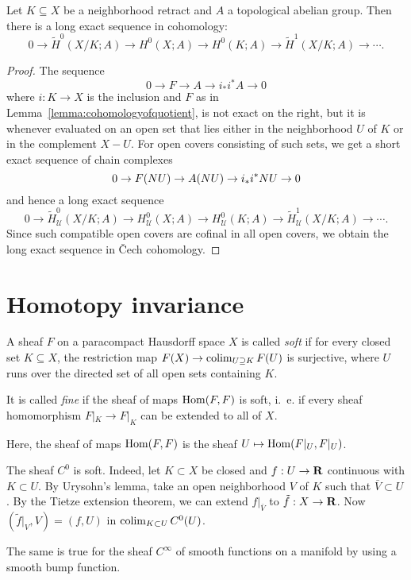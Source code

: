 \documentclass[a4paper,openany]{scrbook}
\newcommand{\nerve}{\mathcal N}
\begin{document}
\begin{corollary}\label{cor:sesforspaces}
Let $K \subseteq X$ be a neighborhood retract and $A$ a topological abelian group. Then there is a long exact sequence in cohomology:
\[
0 \to \tilde H^0(X/K;A) \to H^0(X;A) \to H^0(K;A) \to \tilde H^1(X/K;A) \to \cdots.
\]
\end{corollary}
\begin{proof}
The sequence
\[
0 \to F \to A \to i_*i^*A \to 0
\]
where $i \colon K \to X$ is the inclusion and $F$ as in Lemma~\ref{lemma:cohomologyofquotient}, is not exact on the right, but it is whenever evaluated on an open set that lies either in the neighborhood $U$ of $K$ or in the complement $X-U$. For open covers consisting of such sets, we get a short exact sequence of chain complexes
\[
0 \to F(\mathcal \nerve U) \to A(\mathcal \nerve U) \to i_*i^*\mathcal \nerve U \to 0
\]
and hence a long exact sequence
\[
0 \to \tilde H^0_{\mathcal U}(X/K;A) \to H^0_{\mathcal U}(X;A) \to H^0_{\mathcal U}(K;A) \to \tilde H^1_{\mathcal U}(X/K;A) \to \cdots.
\]
Since such compatible open covers are cofinal in all open covers, we obtain the long exact sequence in \v Cech cohomology.
\end{proof}


\section{Homotopy invariance}
\begin{defn} A sheaf $F$ on a paracompact Hausdorff space $X$ is called \emph{soft} if for every closed set $K \subseteq X$, the restriction map $F(X) \to \operatorname*{colim}_{U \supseteq K} F(U)$ is surjective, where $U$ runs over the directed set of all open sets containing $K$.

It is called \emph{fine} if the sheaf of maps $\operatorname{Hom}(F,F)$ is soft, i.~e. if every sheaf homomorphism $F|_K \to F|_K$ can be extended to all of $X$.
\end{defn}
Here, the sheaf of maps $\operatorname{Hom}(F,F)$ is the sheaf $U \mapsto \operatorname{Hom}(F|_U,F|_U)$.
\begin{example}
The sheaf $C^0$ is soft. Indeed, let $K \subset X$ be closed and $f:U \to \mathbf R$ continuous with $K \subset U$. By Urysohn's lemma, take an open neighborhood $V$ of $K$ such that $\bar{V} \subset U$. By the Tietze extension theorem, we can extend $f|_{\bar{V}}$ to $\tilde{f}:X \to \mathbf R$. Now $(\tilde{f}|_V,V) = (f,U)$ in $\operatorname*{colim}_{K \subset U}C^0(U)$.

 The same is true for the sheaf $C^\infty$ of smooth functions on a manifold by using a smooth bump function.
\end{example}
\end{document}
